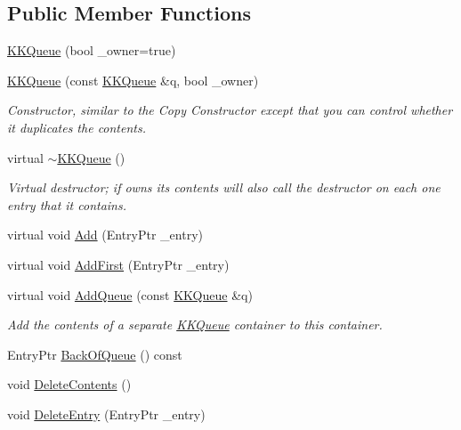 \subsection*{Public Member Functions}
\begin{DoxyCompactItemize}
\item 
\hyperlink{class_k_k_b_1_1_k_k_queue_ac3a8d94136981f1db9ae5a9d591a0008}{K\+K\+Queue} (bool \+\_\+owner=true)
\item 
\hyperlink{class_k_k_b_1_1_k_k_queue_a1b5f9f1225f00bc6932d30028319ead6}{K\+K\+Queue} (const \hyperlink{class_k_k_b_1_1_k_k_queue}{K\+K\+Queue} \&q, bool \+\_\+owner)
\begin{DoxyCompactList}\small\item\em Constructor, similar to the Copy Constructor except that you can control whether it duplicates the contents. \end{DoxyCompactList}\item 
virtual \hyperlink{class_k_k_b_1_1_k_k_queue_a4fe8349c9b1a9c2e203611a10fcdbb2f}{$\sim$\+K\+K\+Queue} ()
\begin{DoxyCompactList}\small\item\em Virtual destructor; if owns its contents will also call the destructor on each one entry that it contains. \end{DoxyCompactList}\item 
virtual void \hyperlink{class_k_k_b_1_1_k_k_queue_adec987ebb0ac593ad877ffa59becb107}{Add} (Entry\+Ptr \+\_\+entry)
\item 
virtual void \hyperlink{class_k_k_b_1_1_k_k_queue_a1832186a944dca6fb3d5fca4046b7c40}{Add\+First} (Entry\+Ptr \+\_\+entry)
\item 
virtual void \hyperlink{class_k_k_b_1_1_k_k_queue_aefa1334998f59c7184911b47addccee3}{Add\+Queue} (const \hyperlink{class_k_k_b_1_1_k_k_queue}{K\+K\+Queue} \&q)
\begin{DoxyCompactList}\small\item\em Add the contents of a separate \hyperlink{class_k_k_b_1_1_k_k_queue}{K\+K\+Queue} container to this container. \end{DoxyCompactList}\item 
Entry\+Ptr \hyperlink{class_k_k_b_1_1_k_k_queue_a9c3fadab17ce05dc750d96b6d3fad064}{Back\+Of\+Queue} () const 
\item 
void \hyperlink{class_k_k_b_1_1_k_k_queue_a72dbe1e65d567536dbf4be3617230254}{Delete\+Contents} ()
\item 
void \hyperlink{class_k_k_b_1_1_k_k_queue_ae362e3b0a128e8a09182e167befda088}{Delete\+Entry} (Entry\+Ptr \+\_\+entry)

\end{DoxyCompactItemize}

